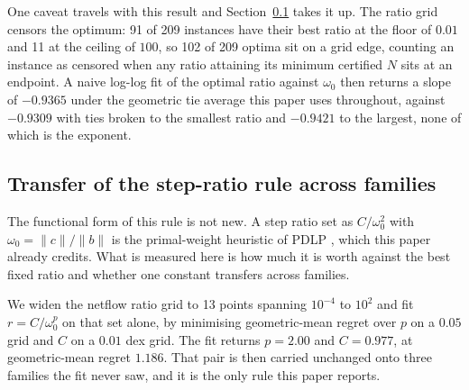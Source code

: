 One caveat travels with this result and Section~\ref{sec:exp:transfer} takes it
up. The ratio grid censors the optimum: 91 of 209 instances have their best
ratio at the floor of $0.01$ and 11 at the ceiling of $100$, so 102 of 209
optima sit on a grid edge, counting an instance as censored when any ratio
attaining its minimum certified $N$ sits at an endpoint. A naive log-log fit of
the optimal ratio against $\omega_0$ then returns a slope of $-0.9365$ under the
geometric tie average this paper uses throughout, against $-0.9309$ with ties
broken to the smallest ratio and $-0.9421$ to the largest, none of which is the
exponent.

\subsection{Transfer of the step-ratio rule across families}
\label{sec:exp:transfer}

The functional form of this rule is not new. A step ratio set as
$C / \omega_0^2$ with $\omega_0 = \lVert c \rVert / \lVert b \rVert$ is the
primal-weight heuristic of PDLP \citep{Applegate2021Practical}, which this paper
already credits. What is measured here is how much it is worth against the best
fixed ratio and whether one constant transfers across families.

We widen the netflow ratio grid to 13 points spanning $10^{-4}$ to $10^{2}$ and
fit $r = C / \omega_0^p$ on that set alone, by minimising geometric-mean regret
over $p$ on a $0.05$ grid and $C$ on a $0.01$ dex grid.
The fit returns $p = 2.00$ and $C = 0.977$, at geometric-mean regret $1.186$.
That pair is then carried unchanged onto three families the fit never saw, and
it is the only rule this paper reports.


